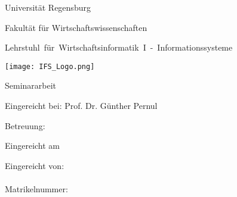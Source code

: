 %
%
%

\thispagestyle{empty}
\begin{titlepage}


\begin{adjustwidth}{-2cm}{}


\renewcommand{\thepage}{}

\begin{center}

\large{Universität Regensburg\\}

\large{Fakultät für Wirtschaftswissenschaften\\}

\large{\mbox{Lehrstuhl für Wirtschaftsinformatik I - Informationssysteme}}

\vspace*{10mm}

\Large{\textbf{\titelthema}}

\vspace*{15mm}
\texttt{[image: IFS\_Logo.png]}
\vspace*{15mm}

\Large{Seminararbeit}

\vspace*{10mm}



\Large{Eingereicht bei: Prof. Dr. Günther Pernul\\}

\Large{Betreuung: \betreuer\\}

\vspace*{5mm}

\large{Eingereicht am \abgabedatum\\}

\end{center}

\vfill

\begin{center}
\end{center}
\vspace*{6mm}
\begin{flushleft}
Eingereicht von:\\
\vspace*{7pt}
\authorname\\
Matrikelnummer: \matrikelnr\\




\end{flushleft}

\end{adjustwidth}

\end{titlepage}

\newpage

